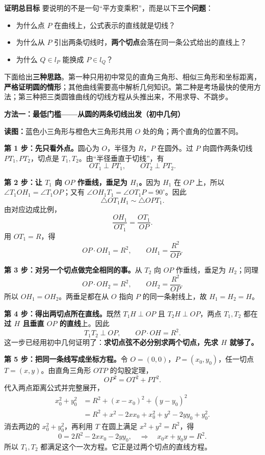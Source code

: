 \begin{proofbox}
\textbf{\textcolor{CProof}{证明总目标}}
要说明的不是一句“平方变乘积”，而是以下\textbf{三个问题}：
\begin{itemize}[leftmargin=*,itemsep=0.3em]
\item 为什么点 $P$ 在曲线上，公式表示的直线就是切线？
\item 为什么从 $P$ 引出两条切线时，\textbf{两个切点}会落在同一条公式给出的直线上？
\item 为什么 $Q\in l_P$ 能换成 $P\in l_Q$？
\end{itemize}
下面给出\textbf{三种思路}。第一种只用初中常见的直角三角形、相似三角形和坐标距离，\textbf{严格证明圆的情形}；其他曲线需要高中解析几何知识。第二种是考场最快的使用方法；第三种把三类圆锥曲线的切线方程从头推出来，不用求导、不跳步。

\medskip
\begin{samepage}
\textbf{\textcolor{CProof}{方法一：最低门槛——从圆的两条切线出发（初中几何）}}


\begin{center}\end{center}
\noindent\textbf{读图：}蓝色小三角形与橙色大三角形共用 $O$ 处的角；两个直角的位置不同。
\end{samepage}

\textbf{第 1 步：先只看外点。}圆心为 $O$，半径为 $R$，$P$ 在圆外。过 $P$ 向圆作两条切线 $PT_1,PT_2$，切点是 $T_1,T_2$。由“半径垂直于切线”，有
\[
OT_1\perp PT_1,\qquad OT_2\perp PT_2.
\]

\textbf{第 2 步：让 $T_1$ 向 $OP$ 作垂线，垂足为 $H_1$。}因为 $H_1$ 在 $OP$ 上，所以 $\angle T_1OH_1=\angle T_1OP$；又有 $\angle OH_1T_1=\angle OT_1P=90^\circ$。因此
\[
\triangle OT_1H_1\sim\triangle OPT_1.
\]
由对应边成比例，
\[
\frac{OH_1}{OT_1}=\frac{OT_1}{OP}.
\]
用 $OT_1=R$，得
\[
\boxed{OP\cdot OH_1=R^2},\qquad OH_1=\frac{R^2}{OP}.
\]

\textbf{第 3 步：对另一个切点做完全相同的事。}从 $T_2$ 向 $OP$ 作垂线，垂足为 $H_2$；同理
\[
OP\cdot OH_2=R^2,\qquad OH_2=\frac{R^2}{OP}.
\]
所以 $OH_1=OH_2$。两垂足都在从 $O$ 指向 $P$ 的同一条射线上，故 $H_1=H_2=H$。

\textbf{第 4 步：得出两切点所在直线。}既然 $T_1H\perp OP$ 且 $T_2H\perp OP$，两点 $T_1,T_2$ 都在\textbf{过 $H$ 且垂直 $OP$ 的直线}上。因此
\[
\boxed{T_1T_2\perp OP,\qquad OP\cdot OH=R^2.}
\]
这一步已经用初中几何证明了：\textbf{求切点弦不必分别求两个切点，先求 $H$ 就够了。}

\textbf{第 5 步：把同一条线写成坐标方程。}令 $O=(0,0)$，$P=(x_0,y_0)$，任一切点 $T=(x,y)$。由直角三角形 $OTP$ 的勾股定理，
\[
OP^2=OT^2+PT^2.
\]
代入两点距离公式并完整展开，
\[
\begin{aligned}
x_0^2+y_0^2
 &=R^2+(x-x_0)^2+(y-y_0)^2\\
 &=R^2+x^2-2xx_0+x_0^2+y^2-2yy_0+y_0^2.
\end{aligned}
\]
消去两边的 $x_0^2+y_0^2$，再利用 $T$ 在圆上满足 $x^2+y^2=R^2$，得
\[
0=2R^2-2xx_0-2yy_0,
\quad\Longrightarrow\quad
\boxed{x_0x+y_0y=R^2}.
\]
所以 $T_1,T_2$ 都满足这个一次方程。它正是过两个切点的直线方程。


\end{proofbox}
